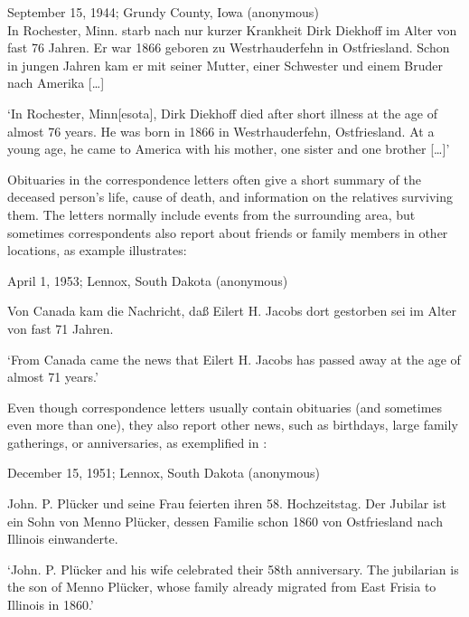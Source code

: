 \documentclass[output=paper]{langsci/langscibook}
\begin{document}
\ea
\label{ex:rocker:4}
September 15, 1944; Grundy County, Iowa (anonymous)\smallskip\\\relax 
In Rochester, Minn. starb nach nur kurzer Krankheit Dirk Diekhoff im Alter von fast 76 Jahren. Er war 1866 geboren zu Westrhauderfehn in Ostfriesland. Schon in jungen Jahren kam er mit seiner Mutter, einer Schwester und einem Bruder nach Amerika […]\smallskip\\\relax 

‘In Rochester, Minn[esota], Dirk Diekhoff died after short illness at the age of almost 76 years. He was born in 1866 in Westrhauderfehn, Ostfriesland. At a young age, he came to America with his mother, one sister and one brother […]’ 
\z

Obituaries in the correspondence letters often give a short summary of the deceased person’s life, cause of death, and information on the relatives surviving them. The letters normally include events from the surrounding area, but sometimes correspondents also report about friends or family members in other locations, as example  illustrates:

\ea
\label{ex:rocker:5}
April 1, 1953; Lennox, South Dakota (anonymous)\smallskip\\\relax 
 
Von Canada kam die Nachricht, daß Eilert H. Jacobs dort gestorben sei im Alter von fast 71 Jahren. \smallskip\\\relax 

‘From Canada came the news that Eilert H. Jacobs has passed away at the age of almost 71 years.’
\z

\begin{sloppypar}
Even though correspondence letters usually contain obituaries (and sometimes even more than one), they also report other news, such as birthdays, large family gatherings, or anniversaries, as exemplified in :
\end{sloppypar}
 
\ea
\label{ex:rocker:6}
December 15, 1951; Lennox, South Dakota (anonymous)\smallskip\\\relax 
 
John. P. Plücker und seine Frau feierten ihren 58. Hochzeitstag. Der Jubilar ist ein Sohn von Menno Plücker, dessen Familie schon 1860 von Ostfriesland nach Illinois einwanderte.\smallskip\\\relax 

‘John. P. Plücker and his wife celebrated their 58th anniversary. The jubilarian is the son of Menno Plücker, whose family already migrated from East Frisia to Illinois in 1860.’
\z
\end{document}
